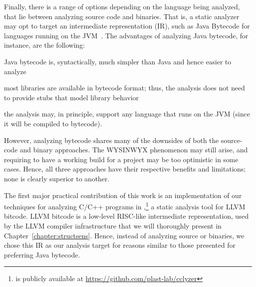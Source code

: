 Finally, there is a range of options depending on the language being
analyzed, that lie between analyzing source code and binaries. That
is, a static analyzer may opt to target an intermediate representation
(IR), such as Java Bytecode for languages running on the
JVM~\cite{Lindholm:1999:JVM:553607}. The advantages of analyzing Java
bytecode, for instance, are the following:
\begin{compactitem}[\(\cdot\)]
\item Java bytecode is, syntactically, much simpler than Java and
  hence easier to analyze
\item most libraries are available in bytecode format; thus, the
  analysis does not need to provide stubs that model library behavior
\item the analysis may, in principle, support any language that runs
  on the JVM (since it will be compiled to bytecode).
\end{compactitem}
However, analyzing bytecode shares many of the downsides of both the source-code and
binary approaches. The WYSINWYX phenomenon may still arise, and
requiring to have a working build for a project may be too optimistic
in some cases. Hence, all three approaches have their respective
benefits and limitations; none is clearly superior to another.

The first major practical contribution of this work is an
implementation of our techniques for analyzing C/C++ programs in
\cclyzer{},\footnote{\cclyzer{} is publicly available at
  \url{https://github.com/plast-lab/cclyzer}} a static analysis tool
for LLVM bitcode. LLVM bitcode is a low-level RISC-like intermediate
representation, used by the LLVM compiler infrastructure
\cite{cgo/LattnerA04} that we will thoroughly present in
Chapter~\ref{chapter:structsens}. Hence, instead of analyzing source
or binaries, we chose this IR as our analysis target for reasons
similar to those presented for preferring Java bytecode.

